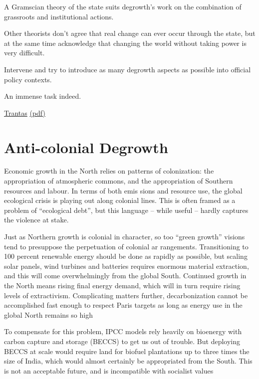 \documentclass[
]{book}
\begin{document}
A Gramscian theory of the state suits degrowth's work on the combination of grassroots and institutional actions.

Other theorists don't agree that real change can ever occur through the state, but at the same time
acknowledge that changing the world without taking power is very difficult.

Intervene and try to
introduce as many degrowth aspects as possible into official policy contexts.

An immense task indeed.

\href{https://journals.librarypublishing.arizona.edu/jpe/article/id/2362/}{Trantas}
\href{pdf/Trantas_2021_Degrowth_vs_Sustainable.pdf}{(pdf)}

\hypertarget{anti-colonial-degrowth}{%
\section{Anti-colonial Degrowth}\label{anti-colonial-degrowth}}

Economic growth in the North relies on patterns of
colonization: the appropriation of atmospheric commons, and the
appropriation of Southern resources and labour. In terms of both emis­
sions and resource use, the global ecological crisis is playing out along
colonial lines. This is often framed as a problem of ``ecological debt'', but
this language -- while useful -- hardly captures the violence at stake.

Just as Northern growth is colonial in character, so too ``green
growth'' visions tend to presuppose the perpetuation of colonial ar­
rangements. Transitioning to 100 percent renewable energy should be
done as rapidly as possible, but scaling solar panels, wind turbines and
batteries requires enormous material extraction, and this will come
overwhelmingly from the global South. Continued growth in the North
means rising final energy demand, which will in turn require rising
levels of extractivism. Complicating matters further, decarbonization
cannot be accomplished fast enough to respect Paris targets as long as
energy use in the global North remains so high

To compensate for this problem, IPCC models rely heavily on bioenergy
with carbon capture and storage (BECCS) to get us out of trouble. But
deploying BECCS at scale would require land for biofuel plantations up
to three times the size of India, which would almost certainly be
appropriated from the South. This is not an acceptable future, and is
incompatible with socialist values
\end{document}
